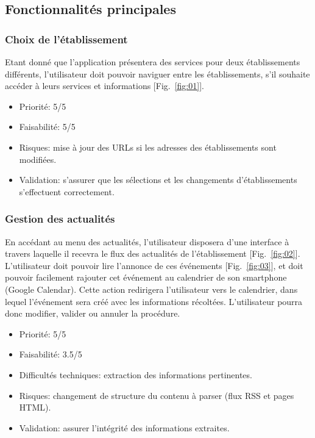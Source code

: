 \documentclass [pdftex,12pt] {report}
\begin{document}
\subsection{Fonctionnalités principales}
\subsubsection{Choix de l'établissement}
Etant donné que l'application présentera des services pour deux établissements différents, l'utilisateur doit pouvoir naviguer entre les établissements, s'il souhaite accéder à leurs services et informations [Fig.~\ref{fig:01}]. \\

\begin{itemize}
\renewcommand{\labelitemi}{$\bullet$}
\item Priorité: 5/5
\item Faisabilité: 5/5
\item Risques: mise à jour des URLs si les adresses des établissements sont modifiées.
\item Validation: s'assurer que les sélections et les changements d'établissements s'effectuent correctement.
\end{itemize}

\subsubsection{Gestion des actualités}
En accédant au menu des actualités, l'utilisateur disposera d'une interface à travers laquelle il recevra le flux des actualités de l'établissement [Fig.~\ref{fig:02}]. L'utilisateur doit pouvoir lire l'annonce de ces événements [Fig.~\ref{fig:03}], et doit pouvoir facilement rajouter cet événement au calendrier de son smartphone (Google Calendar). Cette action redirigera l'utilisateur vers le calendrier, dans lequel l'événement sera créé avec les informations récoltées. L'utilisateur pourra donc modifier, valider ou annuler la procédure. \\

\begin{itemize}
\renewcommand{\labelitemi}{$\bullet$}
\item Priorité: 5/5
\item Faisabilité: 3.5/5
\item Difficultés techniques: extraction des informations pertinentes.
\item Risques: changement de structure du contenu à parser (flux RSS et pages HTML).
\item Validation: assurer l'intégrité des informations extraites.
\end{itemize}
\end{document}
